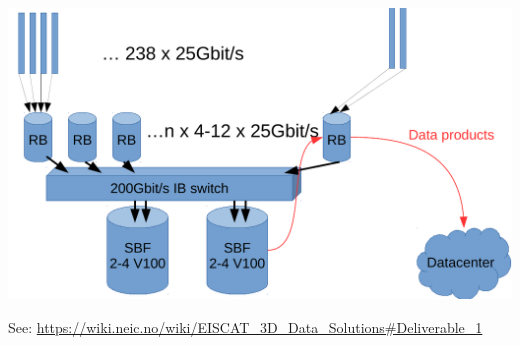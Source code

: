 \begin{frame}[fragile,t]
\frametitle{\hfill}
\vspace{\mytopbit}
\begin{center}
  \includegraphics[width=\textwidth]{SBF-GPU.png}
\end{center}
{\colblack See: {\scriptsize \url{https://wiki.neic.no/wiki/EISCAT_3D_Data_Solutions#Deliverable_1}}}
\end{frame}
